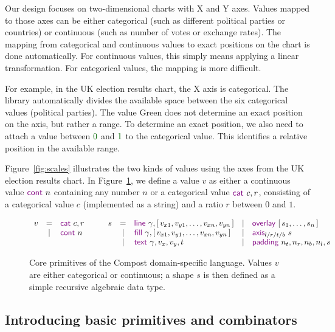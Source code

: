 \documentclass{jfp}
\newcommand{\num}[1]{\textcolor{numclr}{#1}}
\newcommand{\strf}[1]{\textnormal{\textcolor{strclr}{\sffamily #1}}}
\newcommand{\kvd}[1]{\textnormal{\textcolor{kvdclr}{\sffamily #1}}}
\begin{document}
Our design focuses on two-dimensional charts with X and Y axes. Values mapped to those axes
can be either categorical (such as different political parties or countries) or continuous
(such as number of votes or exchange rates). The mapping from categorical and continuous values
to exact positions on the chart is done automatically. For continuous values, this simply means
applying a linear transformation. For categorical values, the mapping is more difficult.

For example, in the UK election results chart, the X axis is categorical. The library automatically
divides the available space between the six categorical values (political parties). The value
\strf{Green} does not determine an exact position on the axis, but rather a range. To determine
an exact position, we also need to attach a value between $\num{0}$ and $\num{1}$ to the
categorical value. This identifies a relative position in the available range.

Figure~\ref{fig:scales} illustrates the two kinds of values using the axes from the UK
election results chart. In Figure~\ref{fig:shape}, we define a value $v$ as either a continuous value
$\kvd{cont}~n$ containing any number $n$ or a categorical value $\kvd{cat}~c, r$, consisting
of a categorical value $c$ (implemented as a string) and a ratio $r$ between $0$ and $1$.
%
\begin{figure}
\begin{equation*}
\begin{array}{rcl}
v & = & \kvd{cat}~c, r \\
  & | & \kvd{cont}~n\\
  ~
\end{array}
\qquad
\begin{array}{rclcl}
s & = &\kvd{line}~\gamma, [\,v_{x1}, v_{y1}, \ldots, v_{xn}, v_{yn}\,] & | & \kvd{overlay}~[\,s_1, \ldots, s_n\,]\\
 & | & \kvd{fill}~\gamma, [\,v_{x1}, v_{y1}, \ldots, v_{xn}, v_{yn}\,] & | &\kvd{axis}_{l/r/t/b}~s\\
 & | & \kvd{text}~\gamma, v_x, v_y, t & | &\kvd{padding}~n_t,n_r,n_b,n_l,s
\end{array}
\end{equation*}
\caption{Core primitives of the Compost domain-specific language. Values $v$ are either categorical
  or continuous; a shape $s$ is then defined as a simple recursive algebraic data type.}
\label{fig:shape}
\end{figure}

\subsection{Introducing basic primitives and combinators}
\end{document}
